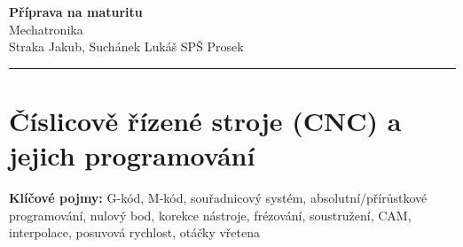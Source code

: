 \documentclass[a4paper,10pt]{article}
\begin{document}
\begin{minipage}[t]{0.75\textwidth}
    {\Huge\bfseries\color{accent} Příprava na maturitu}\\[4pt]
    {\large\color{stripeblue} Mechatronika}\\[2pt]
    \textcolor{medgray}{\small Straka Jakub, Suchánek Lukáš \quad SPŠ Prosek }
\end{minipage}
\hfill
\begin{minipage}[t]{0.22\textwidth}
    \raggedleft
\end{minipage}

\vspace{6pt}
\noindent\color{accent}\rule{\linewidth}{1.5pt}
\vspace{2pt}

\section{Číslicově řízené stroje (CNC) a jejich programování}

\begin{pojmybox}
\textbf{Klíčové pojmy:}
G-kód, M-kód, souřadnicový systém, absolutní/přírůstkové programování,
nulový bod, korekce nástroje, frézování, soustružení, CAM,
interpolace, posuvová rychlost, otáčky vřetena
\end{pojmybox}
\end{document}
